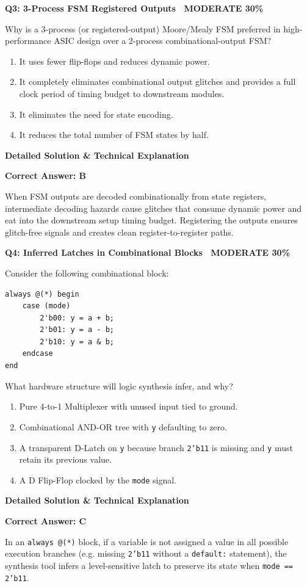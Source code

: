 \documentclass[11pt,a4paper]{article}
\newcommand{\badgemod}{{\color{white}\colorbox{modoran}{\bfseries\sffamily\tiny\ MODERATE 30\%\ }}}
\newenvironment{qbox}[2]{%
  \begin{mdframed}[style=qstyle]%
  {\bfseries\sffamily\color{primaryblue}#1 \hfill #2}\par\vspace{2pt}%
}{%
  \end{mdframed}%
}
\newenvironment{ansbox}{%
  \begin{mdframed}[style=ansstyle]%
  {\bfseries\sffamily\color{ansgreen}\small Detailed Solution \& Technical Explanation}\par\vspace{2pt}\small%
}{%
  \end{mdframed}%
}
\begin{document}
\begin{qbox}{Q3: 3-Process FSM Registered Outputs}{\badgemod}
Why is a 3-process (or registered-output) Moore/Mealy FSM preferred in high-performance ASIC design over a 2-process combinational-output FSM?
\begin{enumerate}[label=\textbf{\Alph*.}]
  \item It uses fewer flip-flops and reduces dynamic power.
  \item It completely eliminates combinational output glitches and provides a full clock period of timing budget to downstream modules.
  \item It eliminates the need for state encoding.
  \item It reduces the total number of FSM states by half.
\end{enumerate}
\end{qbox}
\begin{ansbox}
\textbf{Correct Answer: B}

When FSM outputs are decoded combinationally from state registers, intermediate decoding hazards cause glitches that consume dynamic power and eat into the downstream setup timing budget. Registering the outputs ensures glitch-free signals and creates clean register-to-register paths.
\end{ansbox}

\begin{qbox}{Q4: Inferred Latches in Combinational Blocks}{\badgemod}
Consider the following combinational block:
\begin{lstlisting}[style=verilogstyle]
always @(*) begin
    case (mode)
        2'b00: y = a + b;
        2'b01: y = a - b;
        2'b10: y = a & b;
    endcase
end
\end{lstlisting}
What hardware structure will logic synthesis infer, and why?
\begin{enumerate}[label=\textbf{\Alph*.}]
  \item Pure 4-to-1 Multiplexer with unused input tied to ground.
  \item Combinational AND-OR tree with \texttt{y} defaulting to zero.
  \item A transparent D-Latch on \texttt{y} because branch \texttt{2'b11} is missing and \texttt{y} must retain its previous value.
  \item A D Flip-Flop clocked by the \texttt{mode} signal.
\end{enumerate}
\end{qbox}
\begin{ansbox}
\textbf{Correct Answer: C}

In an \texttt{always @(*)} block, if a variable is not assigned a value in all possible execution branches (e.g. missing \texttt{2'b11} without a \texttt{default:} statement), the synthesis tool infers a level-sensitive latch to preserve its state when \texttt{mode == 2'b11}.
\end{ansbox}
\end{document}
